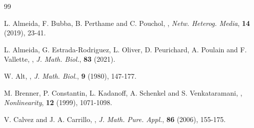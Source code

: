 \documentclass{aims} %
\theoremstyle{definition}
\begin{document}
{%








\begin{thebibliography}{99}

\newblock L. Almeida, F. Bubba, B. Perthame and C. Pouchol, 
\newblock {},
\newblock \emph{Netw. Heterog. Media}, \textbf{14} (2019), 23-41.

\newblock L. Almeida, G. Estrada-Rodriguez, L. Oliver, D.  Peurichard, A. Poulain and F. Vallette, 
\newblock {},
\newblock \emph{J. Math. Biol.}, \textbf{83} (2021).

\newblock W. Alt, 
\newblock {},
\newblock \emph{J. Math. Biol.}, \textbf{9} (1980), 147-177.

\newblock M. Brenner, P. Constantin, L. Kadanoff, A. Schenkel and S. Venkataramani,
\newblock {},
\newblock \emph{Nonlinearity}, \textbf{12} (1999), 1071-1098.

\newblock V. Calvez and J. A. Carrillo, 
\newblock {}, 
\newblock \emph{J. Math. Pure. Appl.}, \textbf{86} (2006), 155-175.


\end{thebibliography}}
\end{document}
